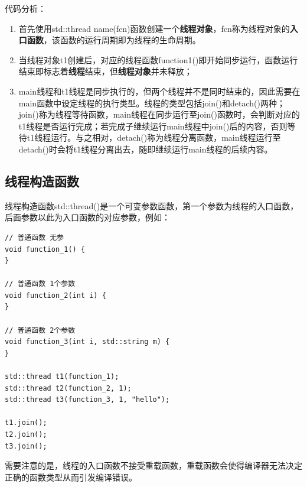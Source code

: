 代码分析：
\begin{enumerate}
	\item 首先使用std::thread name(fcn)函数创建一个\textbf{线程对象}，fcn称为线程对象的\textbf{入口函数}，该函数的运行周期即为线程的生命周期。
	\item 当线程对象t1创建后，对应的线程函数function1()即开始同步运行，函数运行结束即标志着\textbf{线程}结束，但\textbf{线程对象}并未释放；
	\item main线程和t1线程是同步执行的，但两个线程并不是同时结束的，因此需要在main函数中设定线程的执行类型。线程的类型包括join()和detach()两种；join()称为线程等待函数，main线程在同步运行至join()函数时，会判断对应的t1线程是否运行完成；若完成子继续运行main线程中join()后的内容，否则等待t1线程运行。与之相对，detach()称为线程分离函数，main线程运行至detach()时会将t1线程分离出去，随即继续运行main线程的后续内容。
\end{enumerate}
\subsection{线程构造函数}
线程构造函数std::thread()是一个可变参数函数，第一个参数为线程的入口函数，后面参数以此为入口函数的对应参数，例如：
\begin{lstlisting}
// 普通函数 无参
void function_1() {
}

// 普通函数 1个参数
void function_2(int i) {
}

// 普通函数 2个参数
void function_3(int i, std::string m) {
}

std::thread t1(function_1);
std::thread t2(function_2, 1);
std::thread t3(function_3, 1, "hello");

t1.join();
t2.join();
t3.join();
\end{lstlisting}
需要注意的是，线程的入口函数不接受重载函数，重载函数会使得编译器无法决定正确的函数类型从而引发编译错误。

